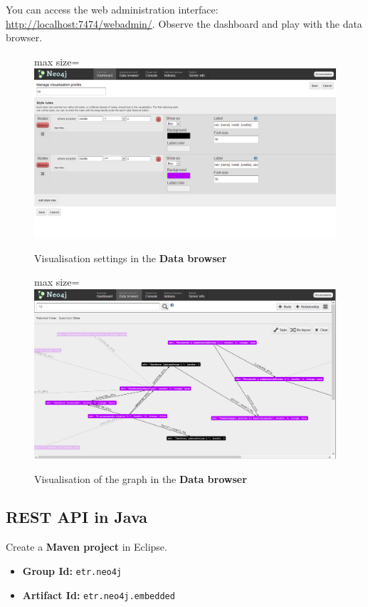 \documentclass[]{report}
\let\Oldincludegraphics\includegraphics
\renewcommand{\includegraphics}[1]{
\begin{adjustbox}{max size={\textwidth}{\textheight}}
    \Oldincludegraphics[scale=0.6]{#1}%
\end{adjustbox}
}
\begin{document}
You can access the web administration interface:
\url{http://localhost:7474/webadmin/}. Observe the dashboard and play
with the data browser.

\begin{figure}[htbp]
\centering
\includegraphics{img/nosql/webui_settings.png}
\caption{Visualisation settings in the \textbf{Data browser}}
\end{figure}

\begin{figure}[htbp]
\centering
\includegraphics{img/nosql/webui_graph.png}
\caption{Visualisation of the graph in the \textbf{Data browser}}
\end{figure}

\subsection{REST API in Java}

Create a \textbf{Maven project} in Eclipse.

\begin{itemize}
\itemsep1pt\parskip0pt
\item
  \textbf{Group Id:} \texttt{etr.neo4j}
\item
  \textbf{Artifact Id:} \texttt{etr.neo4j.embedded}
\end{itemize}
\end{document}
